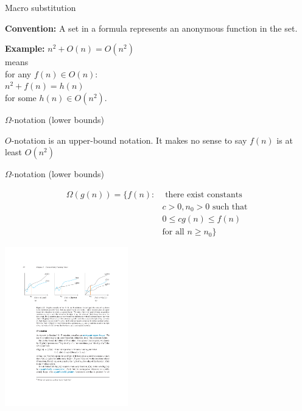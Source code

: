 \documentclass{beamer}
\begin{document}
\begin{frame}{Macro substitution}
    \begin{alertblock}{\textbf{Convention:}}
        A set in a formula represents an anonymous function in the set.
    \end{alertblock}
    \begin{exampleblock}{\textbf{Example:}}
        \vspace{2mm}
        $ n^2 + O(n) = O(n^2) $\\
        means \\
        for any $ f(n) \in O(n)$:\\
        \hspace{6mm} $n^2 + f(n) = h(n)$\\
        \hspace{6mm} for some $h(n) \in O(n^2)$.
    \end{exampleblock}
\end{frame}

\begin{frame}{$\Omega$-notation (lower bounds)}
    \begin{tcolorbox}
        $O$-notation is an upper-bound notation.  It makes no sense to say $f(n)$ is at least $O(n^2)$
    \end{tcolorbox}
\end{frame}

\begin{frame}{$\Omega$-notation (lower bounds)}
    \begin{tcolorbox}
        \vspace{-3mm}
        \begin{align*}
            \Omega(g(n)) = \{ f(n):  & \text{ there exist constants } \\
                                                   & c > 0, n_0 > 0 \text{ such that } \\
                                                   & 0 \leq cg(n) \leq f(n) \\
                                                   & \text{for all } n \geq n_0\}
        \end{align*}
    \end{tcolorbox}
    \vspace{3mm}
    \centering
    \includegraphics[width=0.4\textwidth, trim={8.30cm 18.75cm 8.30cm 4.60cm}, clip]{figures/bigs}
\end{frame}
\end{document}
